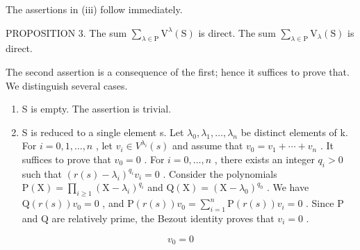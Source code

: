 The assertions in (iii) follow immediately.

PROPOSITION 3. The sum \(\sum_{\lambda \in \mathrm{P}}\mathrm{V}^{\lambda}(\mathrm{S})\) is direct. The sum \(\sum_{\lambda \in \mathrm{P}}\mathrm{V}_{\lambda}(\mathrm{S})\) is direct.

The second assertion is a consequence of the first; hence it suffices to prove that. We distinguish several cases.

\begin{enumerate}
\def\labelenumi{\alph{enumi})}
\item
  S is empty. The assertion is trivial.
\item
  S is reduced to a single element s. Let \(\lambda_{0}, \lambda_{1}, \ldots, \lambda_{n}\) be distinct elements of k. For \(i = 0, 1, \ldots, n\) , let \(v_{i} \in V^{\lambda_{i}}(s)\) and assume that \(v_{0} = v_{1} + \cdots + v_{n}\) . It suffices to prove that \(v_{0} = 0\) . For \(i = 0, \ldots, n\) , there exists an integer \(q_{i} > 0\) such that \((r(s) - \lambda_{i})^{q_{i}} v_{i} = 0\) . Consider the polynomials \(\mathrm{P}(\mathrm{X}) = \prod_{i \geq 1} (\mathrm{X} - \lambda_{i})^{q_{i}}\) and \(\mathrm{Q}(\mathrm{X}) = (\mathrm{X} - \lambda_{0})^{q_{0}}\) . We have \(\mathrm{Q}(r(s)) v_{0} = 0\) , and \(\mathrm{P}(r(s)) v_{0} = \sum_{i=1}^{n} \mathrm{P}(r(s)) v_{i} = 0\) . Since P and Q are relatively prime, the Bezout identity proves that \(v_{i} = 0\) .
\end{enumerate}

\[
v _ {0} = 0
\]

